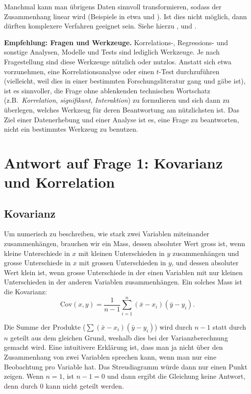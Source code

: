 \documentclass[oneside, 10pt]{book}\usepackage[]{graphicx}\usepackage[]{xcolor}
\begin{document}
Manchmal kann man übrigens
Daten sinnvoll transformieren, sodass der Zusammenhang
linear wird (Beispiele in etwa \citealp{Baayen2008} und \citealp{Gelman2007}).
Ist dies nicht möglich, dann dürften komplexere Verfahren
geeignet sein. Siehe hierzu \citet{Clark2018}, \citet{Wieling2018} und \citet{Baayen2020}.

\medskip

\begin{framed}
\noindent \textbf{Empfehlung: Fragen und Werkzeuge.}
Korrelations-, Regressions- und sonstige Analysen,
Modelle und Tests sind lediglich Werkzeuge. Je nach
Fragestellung sind diese Werkzeuge nützlich oder nutzlos.
Anstatt sich etwa vorzunehmen, eine Korrelationsanalyse
oder einen $t$-Test durchzuführen (vielleicht, weil dies
in einer bestimmten Forschungsliteratur gang und gäbe ist),
ist es sinnvoller, die Frage ohne ablenkenden
technischen Wortschatz (z.B.\ 
\textit{Korrelation}, \textit{signifikant}, \textit{Interaktion})
zu formulieren und sich dann zu überlegen, welches Werkzeug
für deren Beantwortung am nützlichsten ist.
Das Ziel einer Datenerhebung und einer Analyse ist es,
eine Frage zu beantworten, nicht ein bestimmtes Werkzeug zu benutzen.
\end{framed}

\section{Antwort auf Frage 1: Kovarianz und Korrelation}

\subsection{Kovarianz}
Um numerisch zu beschreiben, wie stark zwei Variablen
miteinander zusammenhängen, brauchen wir ein Mass,
dessen absoluter Wert gross ist, wenn kleine Unterschiede
in $x$ mit kleinen Unterschieden in $y$ zusammenhängen
und grosse Unterschiede in $x$ mit grossen Unterschieden
in $y$, und dessen absoluter Wert klein ist, wenn grosse
Unterschiede in der einen Variablen mit nur kleinen Unterschieden
in der anderen Variablen zusammenhängen. Ein solches Mass
ist die Kovarianz:
\begin{equation}\label{eq:covariance}
\textrm{Cov}(x, y) = \frac{1}{n-1} \sum_{i = 1}^{n} (\bar{x} - x_i)(\bar{y}-y_i).
\end{equation}

Die Summe der Produkte ($\sum(\bar{x} - x_i)(\bar{y}-y_i)$) wird durch
$n-1$ statt durch $n$ geteilt aus dem gleichen Grund, weshalb
dies bei der Varianzberechnung gemacht wird. Eine intuitivere
Erklärung ist, dass man ja nicht über den Zusammenhang von zwei
Variablen sprechen kann, wenn man nur eine Beobachtung pro Variable
hat. Das Streudiagramm würde dann nur einen Punkt zeigen.
Wenn $n = 1$, ist $n-1=0$ und dann ergibt die Gleichung keine Antwort,
denn durch 0 kann nicht geteilt werden.
\end{document}
